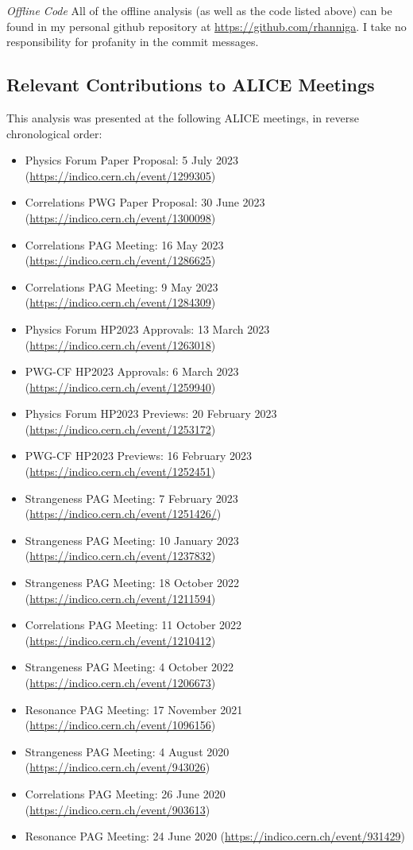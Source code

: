 \documentclass[ALICE,manyauthors]{ALICE_analysis_notes}
\begin{document}
\textit{Offline Code}
All of the offline analysis (as well as the code listed above) can be found in my personal github repository at \url{https://github.com/rhanniga}. I take no responsibility for profanity in the commit messages.

\subsection{Relevant Contributions to ALICE Meetings}
This analysis was presented at the following ALICE meetings, in reverse chronological order:

\begin{itemize}
\item Physics Forum Paper Proposal: 5 July 2023 (\url{https://indico.cern.ch/event/1299305})
\item Correlations PWG Paper Proposal: 30 June 2023 (\url{https://indico.cern.ch/event/1300098})
\item Correlations PAG Meeting: 16 May 2023 (\url{https://indico.cern.ch/event/1286625})
\item Correlations PAG Meeting: 9 May 2023 (\url{https://indico.cern.ch/event/1284309})
\item Physics Forum HP2023 Approvals: 13 March 2023 (\url{https://indico.cern.ch/event/1263018})
\item PWG-CF HP2023 Approvals: 6 March 2023 (\url{https://indico.cern.ch/event/1259940})
\item Physics Forum HP2023 Previews: 20 February 2023 (\url{https://indico.cern.ch/event/1253172})
\item PWG-CF HP2023 Previews: 16 February 2023 (\url{https://indico.cern.ch/event/1252451})
\item Strangeness PAG Meeting: 7 February 2023 (\url{https://indico.cern.ch/event/1251426/})
\item Strangeness PAG Meeting: 10 January 2023 (\url{https://indico.cern.ch/event/1237832})
\item Strangeness PAG Meeting: 18 October 2022 (\url{https://indico.cern.ch/event/1211594})
\item Correlations PAG Meeting: 11 October 2022 (\url{https://indico.cern.ch/event/1210412})
\item Strangeness PAG Meeting: 4 October 2022 (\url{https://indico.cern.ch/event/1206673})
\item Resonance PAG Meeting: 17 November 2021 (\url{https://indico.cern.ch/event/1096156})
\item Strangeness PAG Meeting: 4 August 2020 (\url{https://indico.cern.ch/event/943026})
\item Correlations PAG Meeting: 26 June 2020 (\url{https://indico.cern.ch/event/903613})
\item Resonance PAG Meeting: 24 June 2020 (\url{https://indico.cern.ch/event/931429})
\end{itemize}
\end{document}
